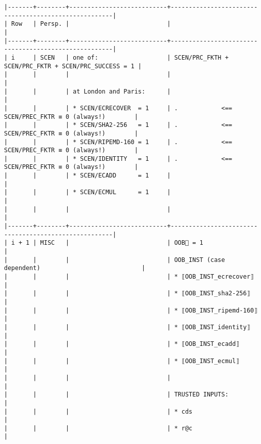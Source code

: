 \documentclass[varwidth=\maxdimen,margin=0.5cm,multi={verbatim}]{standalone}
\begin{document}
\begin{verbatim}
|-------+--------+---------------------------+------------------------------------------------------|
| Row   | Persp. |                           |                                                      |
|-------+--------+---------------------------+------------------------------------------------------|
| i     | SCEN   | one of:                   | SCEN/PRC_FKTH + SCEN/PRC_FKTR + SCEN/PRC_SUCCESS = 1 |
|       |        |                           |                                                      |
|       |        | at London and Paris:      |                                                      |
|       |        | * SCEN/ECRECOVER  = 1     | .            <== SCEN/PREC_FKTR ≡ 0 (always!)        |
|       |        | * SCEN/SHA2-256   = 1     | .            <== SCEN/PREC_FKTR ≡ 0 (always!)        |
|       |        | * SCEN/RIPEMD-160 = 1     | .            <== SCEN/PREC_FKTR ≡ 0 (always!)        |
|       |        | * SCEN/IDENTITY   = 1     | .            <== SCEN/PREC_FKTR ≡ 0 (always!)        |
|       |        | * SCEN/ECADD      = 1     |                                                      |
|       |        | * SCEN/ECMUL      = 1     |                                                      |
|       |        |                           |                                                      |
|-------+--------+---------------------------+------------------------------------------------------|
| i + 1 | MISC   |                           | OOB🏴 = 1                                            |
|       |        |                           | OOB_INST (case dependent)                            |
|       |        |                           | * ⟦OOB_INST_ecrecover⟧                               |
|       |        |                           | * ⟦OOB_INST_sha2-256⟧                                |
|       |        |                           | * ⟦OOB_INST_ripemd-160⟧                              |
|       |        |                           | * ⟦OOB_INST_identity⟧                                |
|       |        |                           | * ⟦OOB_INST_ecadd⟧                                   |
|       |        |                           | * ⟦OOB_INST_ecmul⟧                                   |
|       |        |                           |                                                      |
|       |        |                           | TRUSTED INPUTS:                                      |
|       |        |                           | * cds                                                |
|       |        |                           | * r@c                                                |

\end{verbatim}
\end{document}
